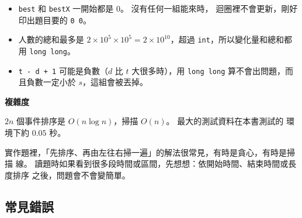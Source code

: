 
\begin{itemize}
\item \texttt{best} 和 \texttt{bestX} 一開始都是 $0$。 沒有任何一組能來時，
迴圈裡不會更新，剛好印出題目要的 \texttt{0 0}。
\item 人數的總和最多是 $2 \times 10^5 \times 10^5 = 2 \times 10^{10}$，超過
\texttt{int}，所以變化量和總和都用 \texttt{long long}。
\item \texttt{t - d + 1} 可能是負數（$d$ 比 $t$ 大很多時），用
\texttt{long long} 算不會出問題，而且負數一定小於 $s$，這組會被丟掉。
\end{itemize}

\textbf{複雜度}

$2n$ 個事件排序是 $O(n \log n)$，掃描 $O(n)$。 最大的測試資料在本書測試的
環境下約 $0.05$ 秒。

\begin{apcsnote}
實作題裡，「先排序、再由左往右掃一遍」的解法很常見，有時是貪心，有時是掃描
線。 讀題時如果看到很多段時間或區間，先想想：依開始時間、結束時間或長度排序
之後，問題會不會變簡單。
\end{apcsnote}

\subsection{常見錯誤}

